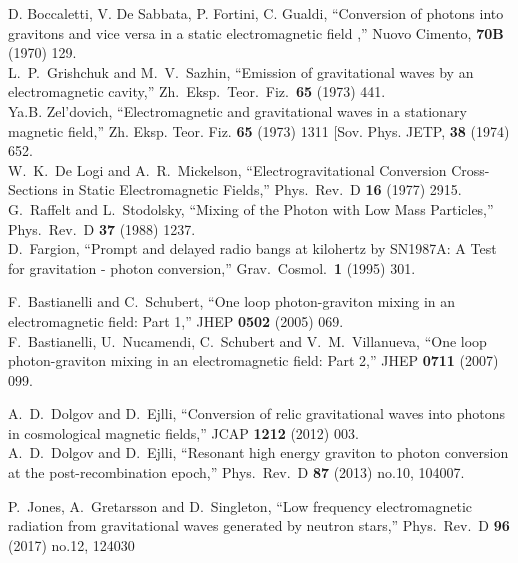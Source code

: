 \documentclass[a4paper,11pt]{article}
\begin{document}
\begin{thebibliography}{99}
D. Boccaletti, V. De Sabbata, P. Fortini, C. Gualdi,   ``Conversion of photons into gravitons and vice versa in a static electromagnetic field ,''
Nuovo Cimento, {\bf 70B} (1970) 129.\\
 L.~P.~Grishchuk and M.~V.~Sazhin,
  ``Emission of gravitational waves by an electromagnetic cavity,''
  Zh.\ Eksp.\ Teor.\ Fiz.\  {\bf 65} (1973) 441.\\
Ya.B. Zel'dovich, ``Electromagnetic and gravitational waves in a stationary magnetic field,''
Zh. Eksp. Teor. Fiz. {\bf 65} (1973) 1311 [Sov. Phys. JETP, {\bf 38} (1974) 652.\\
W.~K.~De Logi and A.~R.~Mickelson,
  ``Electrogravitational Conversion Cross-Sections in Static Electromagnetic Fields,''
  Phys.\ Rev.\ D {\bf 16} (1977) 2915.\\
  G.~Raffelt and L.~Stodolsky,
  ``Mixing of the Photon with Low Mass Particles,''
  Phys.\ Rev.\ D {\bf 37} (1988) 1237. \\
  D.~Fargion,
  ``Prompt and delayed radio bangs at kilohertz by SN1987A: A Test for gravitation - photon conversion,''
  Grav.\ Cosmol.\  {\bf 1} (1995) 301.
   
   F.~Bastianelli and C.~Schubert,
  ``One loop photon-graviton mixing in an electromagnetic field: Part 1,''
  JHEP {\bf 0502} (2005) 069.\\
  F.~Bastianelli, U.~Nucamendi, C.~Schubert and V.~M.~Villanueva,
  ``One loop photon-graviton mixing in an electromagnetic field: Part 2,''
  JHEP {\bf 0711} (2007) 099.  

  A.~D.~Dolgov and D.~Ejlli,
  ``Conversion of relic gravitational waves into photons in cosmological magnetic fields,''
  JCAP {\bf 1212} (2012) 003.\\
  A.~D.~Dolgov and D.~Ejlli,
  ``Resonant high energy graviton to photon conversion at the post-recombination epoch,''
  Phys.\ Rev.\ D {\bf 87} (2013) no.10,  104007.
  
  
  P.~Jones, A.~Gretarsson and D.~Singleton,
  ``Low frequency electromagnetic radiation from gravitational waves generated by neutron stars,''
  Phys.\ Rev.\ D {\bf 96} (2017) no.12,  124030 
  
  
  

\end{thebibliography}
\end{document}
